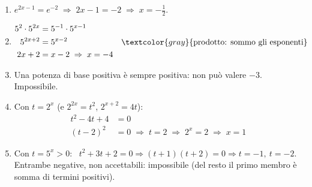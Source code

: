 \begin{question}[ID=3.1, subtitle={Equazioni esponenziali elementari}, difficulty=facile, tags={equazioni, esponenziali}]
\begin{explanation}
\begin{enumerate}
\[\begin{aligned}
    \dfrac{3^2}{3^x} &= 3^3\\
    3^{2-x} &= 3^3 && \textcolor{gray}{\text{quoziente di potenze}}\\
    2-x &= 3 \;\Rightarrow\; x=-1
    \end{aligned}\]
    \item $e^{2x-1}=e^{-2} \;\Rightarrow\; 2x-1=-2 \;\Rightarrow\; x=-\tfrac12$.
    \item \[\begin{aligned}
    5^2\cdot5^{2x} &= 5^{-1}\cdot5^{x-1}\\
    5^{2x+2} &= 5^{x-2} && \textcolor{gray}{\text{prodotto: sommo gli esponenti}}\\
    2x+2 &= x-2 \;\Rightarrow\; x=-4
    \end{aligned}\]
    \item Una potenza di base positiva è sempre positiva: non può valere $-3$. Impossibile.
    \item Con $t=2^x$ (e $2^{2x}=t^2$, $2^{x+2}=4t$):
    \[\begin{aligned}
    t^2-4t+4 &= 0\\
    (t-2)^2 &= 0 \;\Rightarrow\; t=2 \;\Rightarrow\; 2^x=2 \;\Rightarrow\; x=1
    \end{aligned}\]
    \item Con $t=5^x>0$: \ $t^2+3t+2=0 \Rightarrow (t+1)(t+2)=0 \Rightarrow t=-1,\ t=-2$. \\
    Entrambe negative, non accettabili: impossibile (del resto il primo membro è somma di termini positivi).
\end{enumerate}
\end{explanation}
\end{question}


